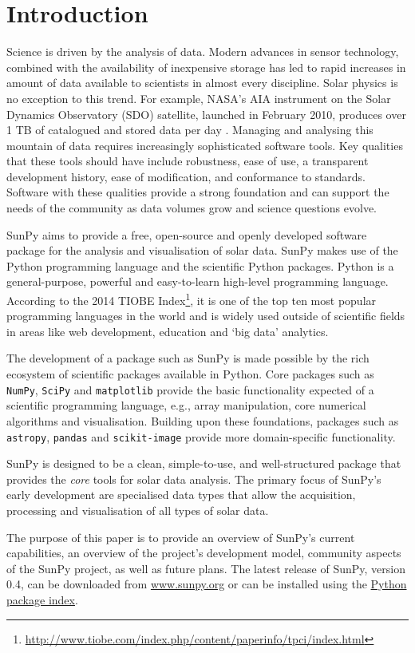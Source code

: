 \section{Introduction}\label{sec:Intro}

Science is driven by the analysis of data. Modern advances in sensor
technology, combined with the availability of inexpensive storage has led to
rapid increases in amount of data available to scientists in almost
every discipline.  Solar physics is no exception to this trend. For example, NASA's
AIA instrument on the Solar Dynamics Observatory (SDO) satellite, launched in February 2010,
produces over 1 TB of catalogued and stored data per day \citep{aia}. Managing and
analysing this mountain of data
requires increasingly sophisticated software tools.  Key qualities
that these tools should have include robustness, ease of use, a
transparent development history, ease of modification, and conformance
to standards.  Software with these qualities provide a strong
foundation and can support the needs of the community as data
volumes grow and science questions evolve.

SunPy aims to provide a free, open-source and openly developed software package 
for the analysis and visualisation of solar data. SunPy makes use of the Python 
programming language and the scientific Python packages. Python is a general-purpose, 
powerful and easy-to-learn high-level programming language.
According to the 2014 TIOBE Index\footnote{\url{http://www.tiobe.com/index.php/content/paperinfo/tpci/index.html}},
 it is one of the top ten most popular programming languages in the world 
and is widely used outside of scientific fields in areas like web development, education 
and `big data' analytics.


The development of a package such as SunPy is made possible by the 
rich ecosystem of scientific packages available in Python. Core packages such 
as \texttt{NumPy}, \texttt{SciPy} and \texttt{matplotlib} 
provide the basic functionality expected of a scientific programming language,
e.g., array manipulation, core numerical algorithms and visualisation. 
Building upon these foundations, packages such as \texttt{astropy}, \texttt{pandas} and 
\texttt{scikit-image} provide more domain-specific functionality.

SunPy is designed to be a clean, simple-to-use, and well-structured 
package that provides the \textit{core} tools for solar data analysis. 
The primary focus of SunPy's early development are 
specialised data types that allow the acquisition, processing and 
visualisation of all types of solar data.

The purpose of this paper is to provide an overview of SunPy's current 
capabilities, an overview of the project's development model, community aspects of the 
SunPy project, as well as future plans. The latest release of SunPy, version 0.4,
can be downloaded from \href{http://sunpy.org}{www.sunpy.org} or can be
installed using the \href{http://pypi.python.org/pypi}{Python package index}.
